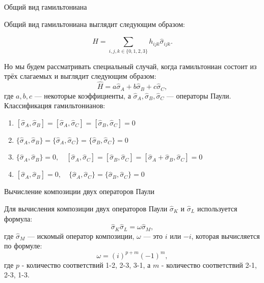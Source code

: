 \documentclass[9pt,pdf,hyperref={unicode=true}]{beamer}
\begin{document}
\begin{frame}[t]{Общий вид гамильтониана}

Общий вид гамильтониана выглядит следующим образом:

\begin{equation}
	\hat{H} = \sum_{i,j,k\in\{0,1,2,3\}} h_{ijk}\hat{\sigma}_{ijk}.
\end{equation}

Но мы будем рассматривать специальный случай, когда гамильтониан состоит из трёх слагаемых и выглядит следующим образом:
\begin{equation}
\hat{H} = a\hat{\sigma}_A + b\hat{\sigma}_B + c\hat{\sigma}_C,
\end{equation}
где $a, b, c$ --- некоторые коэффициенты, а $\hat{\sigma}_A, \hat{\sigma}_B, \hat{\sigma}_C$ --- операторы Паули.\\
\vspace{0.5cm}
Классификация гамильтонианов:
\begin{enumerate}
\item $[\hat{\sigma}_A, \hat{\sigma}_B] = [\hat{\sigma}_A, \hat{\sigma}_C] = [\hat{\sigma}_B, \hat{\sigma}_C] = 0$
\item $\{\hat{\sigma}_A, \hat{\sigma}_B\} = \{\hat{\sigma}_A, \hat{\sigma}_C\} = \{\hat{\sigma}_B, \hat{\sigma}_C\} = 0$
\item $\{\hat{\sigma}_A, \hat{\sigma}_B\} = 0,\quad [\hat{\sigma}_A, \hat{\sigma}_C] = [\hat{\sigma}_B, \hat{\sigma}_C] = [\hat{\sigma}_A + \hat{\sigma}_B, \hat{\sigma}_C] = 0$
\item $[\hat{\sigma}_A, \hat{\sigma}_B] = 0,\quad \{\hat{\sigma}_A, \hat{\sigma}_C\} = \{\hat{\sigma}_B, \hat{\sigma}_C\} = 0$
\end{enumerate}

\end{frame}



\begin{frame}[t]{Вычисление композиции двух операторов Паули}

Для вычисления композиции двух операторов Паули $\hat{\sigma}_K$ и $\hat{\sigma}_L$ используется формула:
\begin{equation} \label{eq6}
\hat{\sigma}_K\hat{\sigma}_L = \omega\hat{\sigma}_M,
\end{equation}
где $\hat{\sigma}_M$ --- искомый оператор композиции, $\omega$ --- это $i$ или $-i$, которая вычисляется по формуле:
\begin{equation} \label{eq7}
\omega = (i)^{p+m}(-1)^m,
\end{equation}
где $p$ - количество соответствий 1-2, 2-3, 3-1, а $m$ - количество соответствий 2-1, 2-3, 1-3.

\end{frame}
\end{document}
